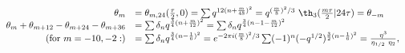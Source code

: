 \begin{equation*}
  \begin{array}{rl}
\theta_m &= \theta_{m,24}({\tau\over 2},0) = \sum
    q^{12(n+{m\over 48})^2} =q^{({m\over
        8})^2/3}~\th_3({m\tau\over 2} |24 \tau) =\theta_{-m}\\ 
\theta_m +\theta_{m+12} -\theta_{m+24} -\theta_{m+36}
    &= \sum \delta_n q^{{3\over 4}(n+{m\over 12})^2} = \sum
    \delta_n q^{{3\over 4}(n-1-{m\over 12})^2} \\
  ({\rm for }~ m=-10,-2:)  &= \sum \delta_n q^{{3\over 4}(n-{1\over 6})^2}
    = e^{-2\pi i({m\over 8})^2/3} \sum (-1)^n (-q^{1/2})^{{3\over
    2}(n-{1\over 6})^2} = {\eta^3 \over \eta_{1/2}~\eta_2},
  \end{array} 
\end{equation*} 
